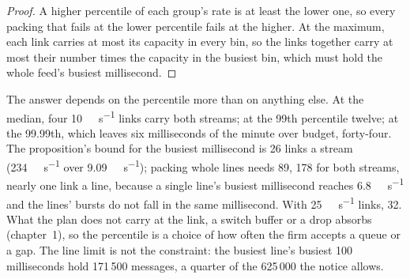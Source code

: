 \begin{proof}
A higher percentile of each group's rate is at least the lower one, so every packing that fails at the lower percentile fails
at the higher. At the maximum, each link carries at most its capacity in every bin, so the links together carry at most their
number times the capacity in the busiest bin, which must hold the whole feed's busiest millisecond.
\end{proof}

\begin{omfigure}

\label{fig:nw:equities-and-options-connectivity:links}
\end{omfigure}

The answer depends on the percentile more than on anything else. At the median, four \qty{10}{\giga\bit\per\second} links carry
both streams; at the 99th percentile twelve; at the 99.99th, which leaves six milliseconds of the minute over budget,
forty-four. The proposition's bound for the busiest millisecond is 26 links a stream (\qty{234}{\giga\bit\per\second} over
\qty{9.09}{\giga\bit\per\second}); packing whole lines needs 89, 178 for both streams, nearly one link a line, because a single
line's busiest millisecond reaches \qty{6.8}{\giga\bit\per\second} and the lines' bursts do not fall in the same millisecond.
With \qty{25}{\giga\bit\per\second} links, 32. What the plan does not carry at the link, a
switch buffer or a drop absorbs (chapter~1), so the percentile is a choice of how often the firm accepts a queue or a gap.
The line limit is not the constraint: the busiest line's busiest 100 milliseconds hold 171\,500 messages, a quarter of the
625\,000 the notice allows.

